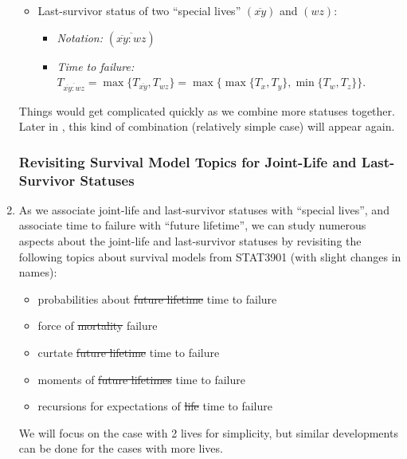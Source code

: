 \begin{enumerate}
\begin{itemize}
\item Last-survivor status of two ``special lives'' \((\overline{xy})\) and \((wz)\):
\begin{itemize}
\item \emph{Notation:} \((\overline{\overline{xy}\!:\!wz})\)
\item \emph{Time to failure:}
\(T_{\overline{\overline{xy}:wz}}=\max\{T_{\overline{xy}},T_{wz}\}
=\max\{\max\{T_x,T_y\},\min\{T_w,T_z\}\}\).
\end{itemize}

\end{itemize}
Things would get complicated quickly as we combine more statuses together.
Later in , this kind of combination
(relatively simple case) will appear again.

\subsubsection*{Revisiting Survival Model Topics for Joint-Life and Last-Survivor Statuses}
\item As we associate joint-life and last-survivor statuses with ``special
lives'', and associate time to failure with ``future lifetime'', we can study
numerous aspects about the joint-life and last-survivor statuses by revisiting
the following topics about survival models from STAT3901 (with slight changes
in names):
\begin{itemize}
\item probabilities about \sout{future lifetime} time to failure
\item force of \sout{mortality} failure
\item curtate \sout{future lifetime} time to failure
\item moments of \sout{future lifetimes} time to failure
\item recursions for expectations of \sout{life} time to failure
\end{itemize}
\begin{note}
We will focus on the case with 2 lives for simplicity, but similar developments
can be done for the cases with more lives.
\end{note}


\end{enumerate}
